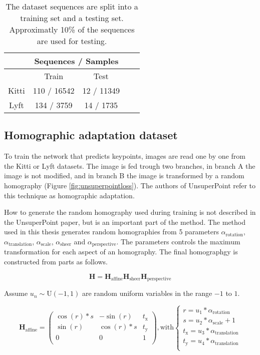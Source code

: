 \begin{table}[H]
	\centering
	\begin{tabular}{ |c|c|c|c|c| } 
		\hline
		&\multicolumn{2}{c|}{Sequences / Samples} \\ 
		\hline
		& Train & Test \\ 
		\hline
		Kitti & 110 / 16542 & 12 / 11349 \\ 
		\hline
		Lyft & 134 / 3759 & 14 / 1735 \\ 
		\hline
	\end{tabular}
	\caption{The dataset sequences are split into a training set and a testing set. Approximatly 10\% of the sequences are used for testing.}
	\label{table:datasets}
\end{table}

\subsection{Homographic adaptation dataset}

To train the network that predicts keypoints, images are read one by one from the Kitti or Lyft datasets. The image is fed trough two branches, in branch A the image is not modified, and in branch B the image is transformed by a random homography (Figure \ref{fig:unsuperpointloss}). The authors of UnsuperPoint refer to this technique as homographic adaptation.

How to generate the random homography used during training is not described in the UnsuperPoint paper, but is an important part of the method. The method used in this thesis generates random homographies from 5 parameters $\alpha_{\mathrm{rotation}}$, $\alpha_{\mathrm{translation}}$, $\alpha_{\mathrm{scale}}$, $\alpha_{\mathrm{sheer}}$ and $\alpha_{\mathrm{perspective}}$. The parameters controls the maximum transformation for each aspect of an homography. The final homographgy is constructed from parts as follows.

\begin{equation}
\textbf{H} = \textbf{H}_{\mathrm{affine}} \textbf{H}_{\mathrm{sheer}} \textbf{H}_{\mathrm{perspective}}
\end{equation}

Assume $u_n \sim \mathrm{U}(-1,1)$ are random uniform variables in the range $-1$ to $1$.

\begin{equation}
\textbf{H}_{\mathrm{affine}} = 
\begin{pmatrix}
\cos(r)*s & -\sin(r) & t_\mathrm{x} \\
\sin(r)& \cos(r)*s & t_\mathrm{y} \\
0 & 0 & 1 \\
\end{pmatrix}
, \text{with}
\begin{cases}
r=u_1*\alpha_{\mathrm{rotation}} \\
s=u_2*\alpha_{\mathrm{scale}}+1 \\
t_\mathrm{x}=u_3*\alpha_{\mathrm{translation}} \\
t_\mathrm{y}=u_4*\alpha_{\mathrm{translation}} \\
\end{cases}
\end{equation}

